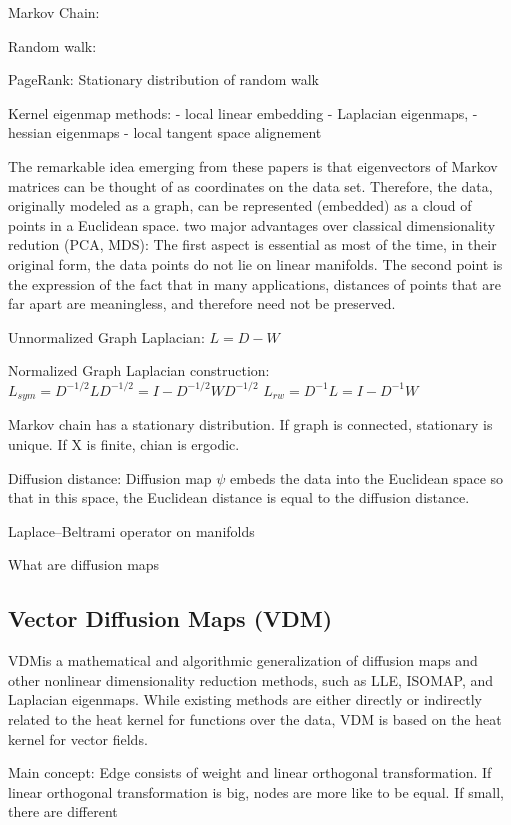 Markov Chain:

Random walk:

PageRank:
Stationary distribution of random walk

Kernel eigenmap methods:
- local linear embedding
- Laplacian eigenmaps,
- hessian eigenmaps
- local tangent space alignement

The remarkable idea emerging from these papers is that eigenvectors of Markov matrices can be thought of as coordinates
on the data set. Therefore, the data, originally modeled as a graph, can be represented (embedded) as a cloud of points
in a Euclidean space.
two major advantages over classical dimensionality redution (PCA, MDS):
The first aspect is essential as most of the time, in their original form, the data points do not lie on
 linear manifolds.
 The second point is the expression of the fact that in many
applications, distances of points that are far apart are meaningless, and therefore need not be preserved.

Unnormalized Graph Laplacian:
$L = D - W$

Normalized Graph Laplacian construction:
$L_{sym} = D^{-1/2}LD^{-1/2} = I - D^{-1/2}WD^{-1/2} $
$L_{rw} = D^{-1}L = I - D^{-1}W $

Markov chain has a stationary distribution.
If graph is connected, stationary is unique.
If X is finite, chian is ergodic.

Diffusion distance:
Diffusion map $\psi$ embeds the data into the Euclidean space so that in this space, the Euclidean
distance is equal to the diffusion distance.

Laplace–Beltrami operator on manifolds

What are diffusion maps

\subsection{Vector Diffusion Maps (VDM)}

\cite{vectorDiffusionMaps}
VDMis a mathematical and algorithmic generalization of diffusion maps
and other nonlinear dimensionality reduction methods, such as LLE, ISOMAP,
and Laplacian eigenmaps. While existing methods are either directly or indirectly
related to the heat kernel for functions over the data, VDM is based on
the heat kernel for vector fields.

Main concept:
Edge consists of weight and linear orthogonal transformation.
If linear orthogonal transformation is big, nodes are more like to be equal.
If small, there are different

